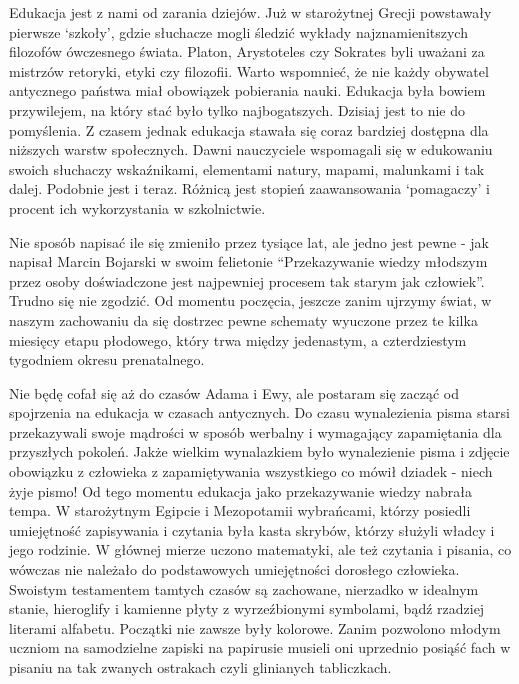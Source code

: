 \documentclass{article}
\begin{document}
	\par
	Edukacja jest z nami od zarania dziejów. Już w starożytnej Grecji powstawały pierwsze ‘szkoły’, gdzie słuchacze mogli śledzić wykłady najznamienitszych filozofów ówczesnego świata. Platon, Arystoteles czy Sokrates byli uważani za mistrzów retoryki, etyki czy filozofii. Warto wspomnieć, że nie każdy obywatel antycznego państwa miał obowiązek pobierania nauki. Edukacja była bowiem przywilejem, na który stać było tylko najbogatszych. Dzisiaj jest to nie do pomyślenia. Z czasem jednak edukacja stawała się coraz bardziej dostępna dla niższych warstw społecznych. Dawni nauczyciele wspomagali się w edukowaniu swoich słuchaczy wskaźnikami, elementami natury, mapami, malunkami i tak dalej. Podobnie jest i teraz. Różnicą jest stopień zaawansowania ‘pomagaczy’ i procent ich wykorzystania w szkolnictwie.
	\par
	Nie sposób napisać ile się zmieniło przez tysiące lat, ale jedno jest pewne - jak napisał Marcin Bojarski w swoim felietonie\cite{ref1} “Przekazywanie wiedzy młodszym przez osoby doświadczone jest najpewniej procesem tak starym jak człowiek”. Trudno się nie zgodzić. Od momentu poczęcia, jeszcze zanim ujrzymy świat, w naszym zachowaniu da się dostrzec pewne schematy wyuczone przez te kilka miesięcy etapu płodowego, który trwa między jedenastym, a czterdziestym tygodniem okresu prenatalnego.
	\par
	Nie będę cofał się aż do czasów Adama i Ewy, ale postaram się zacząć od spojrzenia na edukacja w czasach antycznych. Do czasu wynalezienia pisma starsi przekazywali swoje mądrości w sposób werbalny i wymagający zapamiętania dla przyszłych pokoleń. Jakże wielkim wynalazkiem było wynalezienie pisma i zdjęcie obowiązku z człowieka z zapamiętywania wszystkiego co mówił dziadek - niech żyje pismo! Od tego momentu edukacja jako przekazywanie wiedzy nabrała tempa. W starożytnym Egipcie i Mezopotamii wybrańcami, którzy posiedli umiejętność zapisywania i czytania była kasta skrybów, którzy służyli władcy i jego rodzinie. W głównej mierze uczono matematyki, ale też czytania i pisania, co wówczas nie należało do podstawowych umiejętności dorosłego człowieka. Swoistym testamentem tamtych czasów są zachowane, nierzadko w idealnym stanie, hieroglify i kamienne płyty z wyrzeźbionymi symbolami, bądź rzadziej literami alfabetu. Początki nie zawsze były kolorowe. Zanim pozwolono młodym uczniom na samodzielne zapiski na papirusie musieli oni uprzednio posiąść fach w pisaniu na tak zwanych ostrakach czyli glinianych tabliczkach.
	\par
\end{document}
